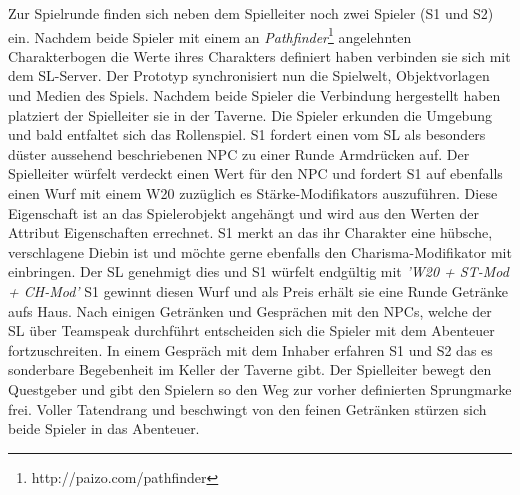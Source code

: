 Zur Spielrunde finden sich neben dem Spielleiter noch zwei Spieler (S1 und S2) ein. Nachdem beide Spieler mit einem an \emph{Pathfinder}\footnote{http://paizo.com/pathfinder} angelehnten Charakterbogen die Werte ihres Charakters definiert haben verbinden sie sich mit dem SL-Server. Der Prototyp synchronisiert nun die Spielwelt, Objektvorlagen und Medien des Spiels. Nachdem beide Spieler die Verbindung hergestellt haben platziert der Spielleiter sie in der Taverne.\newline
Die Spieler erkunden die Umgebung und bald entfaltet sich das Rollenspiel. S1 fordert einen vom SL als besonders düster aussehend beschriebenen NPC zu einer Runde Armdrücken auf.\newline
Der Spielleiter würfelt verdeckt einen Wert für den NPC und fordert S1 auf ebenfalls einen Wurf mit einem W20 zuzüglich es Stärke-Modifikators auszuführen. Diese Eigenschaft ist an das Spielerobjekt angehängt und wird aus den Werten der Attribut Eigenschaften errechnet. S1 merkt an das ihr Charakter eine hübsche, verschlagene Diebin ist und möchte gerne ebenfalls den Charisma-Modifikator mit einbringen. Der SL genehmigt dies und S1 würfelt endgültig mit \emph{'W20 + ST-Mod + CH-Mod'} \newline
S1 gewinnt diesen Wurf und als Preis erhält sie eine Runde Getränke aufs Haus.\newline
Nach einigen Getränken und Gesprächen mit den NPCs, welche der SL über Teamspeak durchführt entscheiden sich die Spieler mit dem Abenteuer fortzuschreiten. In einem Gespräch mit dem Inhaber erfahren S1 und S2 das es sonderbare Begebenheit im Keller der Taverne gibt. Der Spielleiter bewegt den Questgeber und gibt den Spielern so den Weg zur vorher definierten Sprungmarke frei.\newline
Voller Tatendrang und beschwingt von den feinen Getränken stürzen sich beide Spieler in das Abenteuer.

